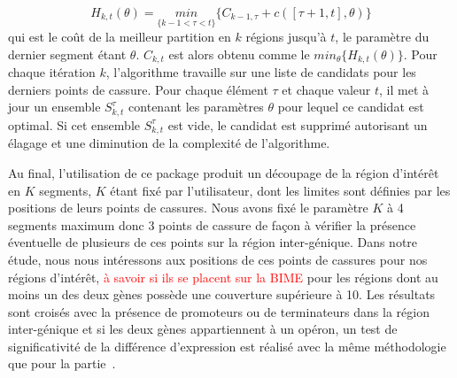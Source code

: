 \documentclass[12pt,a4paper]{report}
\begin{document}
\begin{onehalfspace}
\[ H_{k,t}(\theta) = \underset{\{k-1<\tau<t\}}{min} \{C_{k-1,\tau} + c([\tau + 1,t],\theta)\} \]
qui est le coût de la meilleur partition en $k$ régions jusqu'à $t$, le paramètre du dernier segment étant $\theta$. $C_{k,t}$ est alors obtenu comme le $min_\theta\{H_{k,t}(\theta)\}$.
Pour chaque itération $k$, l'algorithme travaille sur une liste de candidats pour les derniers points de cassure. Pour chaque élément $\tau$ et chaque valeur $t$, il met à jour un ensemble $S_{k,t}^\tau$ contenant les paramètres $\theta$ pour lequel ce candidat est optimal. Si cet ensemble $S_{k,t}^\tau$ est vide, le candidat est supprimé autorisant un élagage et une diminution de la complexité de l'algorithme.

Au final, l'utilisation de ce package produit un découpage de la région d'intérêt en $K$ segments, $K$ étant fixé par l'utilisateur, dont les limites sont définies par les positions de leurs points de cassures. Nous avons fixé le paramètre $K$ à 4 segments maximum donc 3 points de cassure de façon à vérifier la présence éventuelle de plusieurs de ces points sur la région inter-génique.
Dans notre étude, nous nous intéressons aux positions de ces points de cassures pour nos régions d'intérêt, \textcolor{red}{à savoir si ils se placent sur la BIME} pour les régions dont au moins un des deux gènes possède une couverture supérieure à 10. Les résultats sont croisés avec la présence de promoteurs ou de terminateurs dans la région inter-génique et si les deux gènes appartiennent à un opéron, un test de significativité de la différence d'expression est réalisé avec la même méthodologie que pour la partie~.


\end{onehalfspace}
\end{document}
